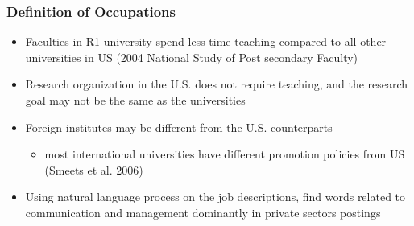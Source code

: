 \documentclass[11pt]{beamer}
\begin{document}
\begin{frame}[label=Occupation]
	\frametitle{Definition of Occupations}
	\begin{itemize}
	
			\item Faculties in R1 university spend less time teaching compared to all other universities in US {\footnotesize (2004 National Study of Post secondary Faculty)}%
			
			\item Research organization in the U.S. does not require teaching, and the research goal may not be the same as the universities
			\vspace{1.5 mm}
			\item Foreign institutes may be different from the U.S. counterparts
			\begin{itemize}
				\item most international universities have different promotion policies from  US (Smeets et al. 2006)
			\end{itemize}
		\vspace{1.5 mm}
			\item Using natural language process on the job descriptions, find words related to communication and management dominantly in private sectors postings  \hyperlink{NLP}{}
		\end{itemize}

\end{frame}
\end{document}
